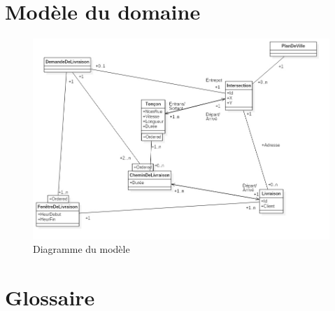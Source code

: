 \documentclass[10pt,a4paper]{book}
\begin{document}
\section{Modèle du domaine}
\begin{figure}[H]
    \centering
    \includegraphics[scale=0.5]{dia-mod.jpg}
    \caption{Diagramme du modèle}
\end{figure}
\section{Glossaire}
\end{document}
